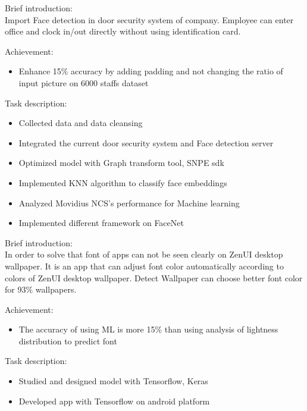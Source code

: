 \documentclass{resume}
\begin{document}
\begin{description}
\item Brief introduction:\\
Import Face detection in door security system of company. Employee can enter office and clock in/out directly without using identification card.\\
\item Achievement:
\begin{itemize}
  \item Enhance 15\% accuracy by adding padding and not changing the ratio of input picture on 6000 staffs dataset
\end{itemize}
\item Task description:
\begin{itemize}
  \item Collected data and data cleansing
  \item Integrated the current door security system and Face detection server
  \item Optimized model with Graph transform tool, SNPE sdk
  \item Implemented KNN algorithm to classify face embeddings
  \item Analyzed Movidius NCS's performance for Machine learning
  \item Implemented different framework on FaceNet
\end{itemize}
\end{description}
 {}
\begin{description}
\item Brief introduction:\\
In order to solve that font of apps can not be seen clearly on ZenUI desktop wallpaper. It is an app that can adjust font color automatically according to colors of ZenUI desktop wallpaper. Detect Wallpaper can choose better font color for 93\% wallpapers.\\
\item Achievement:
\begin{itemize}
  \item The accuracy of using ML is more 15\% than using analysis of lightness distribution to predict font 
\end{itemize}
\item Task description:
\begin{itemize}
  \item Studied and designed model with Tensorflow, Keras
  \item Developed app with Tensorflow on android platform 
\end{itemize}
\end{description}
\end{document}
